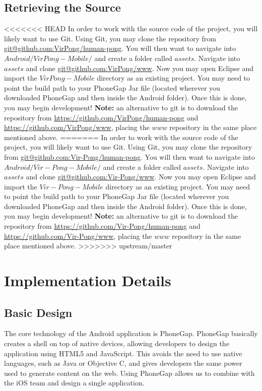 \documentclass[12pt]{article}
\begin{document}
\subsection{Retrieving the Source}
<<<<<<< HEAD
In order to work with the source code of the project, you will likely want to use Git\cite{Github}.  Using Git, you may clone the repository from \url{git@github.com:VirPong/human-pong}.  You will then want to navigate into $Android/VirPong-Mobile/$ and create a folder called $assets$.  Navigate into $assets$ and clone \url{git@github.com:VirPong/www}.  Now you may open Eclipse and import the $VirPong-Mobile$ directory as an existing project.  You may need to point the build path to your PhoneGap Jar file (located wherever you downloaded PhoneGap and then inside the Android folder).  Once this is done, you may begin development!  \textbf{Note:} an alternative to git is to download the repository from \url{https://github.com/VirPong/human-pong} and \url{https://github.com/VirPong/www}, placing the $www$ repository in the same place mentioned above.
=======
In order to work with the source code of the project, you will likely want to use Git\cite{Github}.  Using Git, you may clone the repository from \url{git@github.com:Vir-Pong/human-pong}.  You will then want to navigate into $Android/Vir-Pong-Mobile/$ and create a folder called $assets$.  Navigate into $assets$ and clone \url{git@github.com:Vir-Pong/www}.  Now you may open Eclipse and import the $Vir-Pong-Mobile$ directory as an existing project.  You may need to point the build path to your PhoneGap Jar file (located wherever you downloaded PhoneGap and then inside the Android folder).  Once this is done, you may begin development!  \textbf{Note:} an alternative to git is to download the repository from \url{https://github.com/Vir-Pong/human-pong} and \url{https://github.com/Vir-Pong/www}, placing the $www$ repository in the same place mentioned above.
>>>>>>> upstream/master



\section{Implementation Details}

\subsection{Basic Design}
The core technology of the Android application is PhoneGap\cite{PhoneGap-About}.  PhoneGap basically creates a shell on top of native devices, allowing developers to design the application using HTML5 and JavaScript.  This avoids the need to use native languages, such as Java or Objective C, and gives developers the same power used to generate content on the web.  Using PhoneGap allows us to combine with the iOS team and design a single application.  
\end{document}
